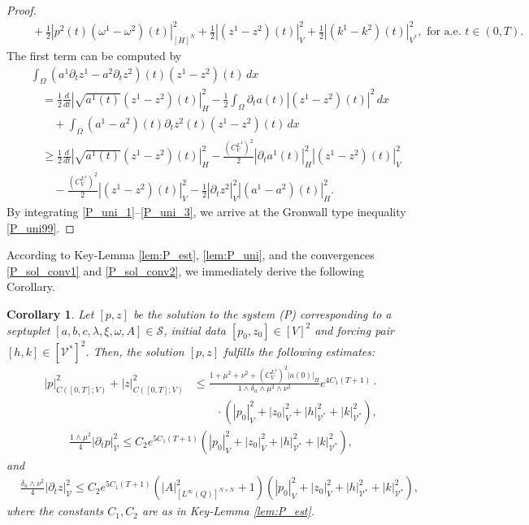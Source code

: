 \documentclass{sinst}
\numberwithin{equation}{section}
\theoremstyle{plain}
\newtheorem{cor}{Corollary}%
\theoremstyle{definition}
\def\sS{\mathscr{S}}
\def\sV{\mathscr{V}}
\begin{document}
\begin{proof}
\begin{align}
    &\quad + \frac{1}{2}|p^2(t)(\omega^1 - \omega^2)(t)|_{[H]^N}^2 + \frac{1}{2}|(z^1 - z^2)(t)|_V^2 + \frac{1}{2}|(k^1 - k^2)(t)|_{V^*}^2, \mbox{ for a.e. } t \in (0,T).
  \end{align} 
  The first term can be computed by
  \begin{align}
    &\int_\Omega (a^1 \partial_t z^1 - a^2 \partial_t z^2)(t) (z^1 - z^2)(t)\,dx \label{P_uni_3}
    \\
    &\quad = \frac{1}{2} \frac{d}{dt} |\sqrt{a^1(t)} (z^1 - z^2)(t)|_H^2 - \frac{1}{2} \int_\Omega \partial_t a(t)|(z^1 - z^2)(t)|^2 \,dx 
    \\
    &\qquad + \int_\Omega (a^1 - a^2)(t) \partial_t z^2(t) (z^1 - z^2)(t) \,dx
    \\
    &\quad \geq \frac{1}{2} \frac{d}{dt} |\sqrt{a^1(t)} (z^1 - z^2)(t)|_H^2 - \frac{(C_V^{L^4})^2}{2} |\partial_t a^1(t)|_H^2 |(z^1 - z^2)(t)|_V^2
    \\
    &\qquad - \frac{(C_V^{L^4})^2}{2}|(z^1 - z^2)(t)|_V^2 - \frac{1}{2}|\partial_t z^2|_V^2 |(a^1 - a^2)(t)|_H^2.
  \end{align}
  By integrating \eqref{P_uni_1}--\eqref{P_uni_3}, we arrive at the Gronwall type inequality \eqref{P_uni99}.
\end{proof}

According to Key-Lemma \ref{lem:P_est}, \ref{lem:P_uni}, and the convergences \eqref{P_sol_conv1} and \eqref{P_sol_conv2}, we immediately derive the following Corollary.

\begin{cor}\label{cor:P_est}
  Let $[p,z]$ be the solution to the system (P) corresponding to a septuplet $[a,b,c,\lambda,\xi,\omega,A] \in \sS$, initial data $[p_0,z_0] \in [V]^2$ and forcing pair $[h,k] \in [\sV^*]^2$. Then, the solution $[p,z]$ fulfills the following estimates:
    \begin{align}
      |p|_{C([0,T];V)}^2 + |z|_{C([0,T];V)}^2 &\leq \frac{1 + \mu^2 + \nu^2 + (C_V^{L^4})^2|a(0)|_H}{1 \wedge \delta_a \wedge \mu^2 \wedge \nu^2}e^{4 C_1 (T+1)}\cdot
      \\
      &\qquad \cdot (|p_0|_V^2 + |z_0|_V^2 + |h|_{\sV^*}^2 + |k|_{\sV^*}^2), \label{P_est_97}
    \end{align}
    \begin{gather}
      \frac{1 \wedge \mu^2}{4}|\partial_t p|_{\sV}^2 \leq C_2 e^{5C_1 (T + 1)} (|p_0|_V^2 + |z_0|_V^2 + |h|_{\sV^*}^2 + |k|_{\sV^*}^2), \label{P_TD_est98}
    \end{gather}
    and
    \begin{align}
      &\frac{\delta_a \wedge \nu^2}{4}|\partial_t z|_{\sV}^2 \leq C_2 e^{5 C_1 (T + 1)}(|A|_{[L^\infty(Q)]^{N \times N}}^2 + 1) (|p_0|_V^2 + |z_0|_V^2 + |h|_{\sV^*}^2 + |k|_{\sV^*}^2), \label{P_TD_est99}
    \end{align}
    where the constants $C_1, C_2$ are as in Key-Lemma \ref{lem:P_est}.
\end{cor} 
\end{document}
